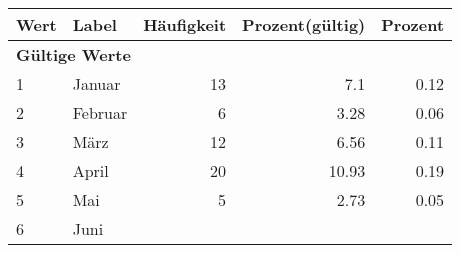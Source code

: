      \begin{longtable}{lXrrr}
     \toprule
     \textbf{Wert} & \textbf{Label} & \textbf{Häufigkeit} & \textbf{Prozent(gültig)} & \textbf{Prozent} \\
     \endhead
     \midrule
     \multicolumn{5}{l}{\textbf{Gültige Werte}}\\

     1 &
     \multicolumn{1}{X}{ Januar   } &


       \num{13} &
       \num[round-mode=places,round-precision=2]{7,1} &
         \num[round-mode=places,round-precision=2]{0,12} \\

     2 &
     \multicolumn{1}{X}{ Februar   } &


       \num{6} &
       \num[round-mode=places,round-precision=2]{3,28} &
         \num[round-mode=places,round-precision=2]{0,06} \\

     3 &
     \multicolumn{1}{X}{ März   } &


       \num{12} &
       \num[round-mode=places,round-precision=2]{6,56} &
         \num[round-mode=places,round-precision=2]{0,11} \\

     4 &
     \multicolumn{1}{X}{ April   } &


       \num{20} &
       \num[round-mode=places,round-precision=2]{10,93} &
         \num[round-mode=places,round-precision=2]{0,19} \\

     5 &
     \multicolumn{1}{X}{ Mai   } &


       \num{5} &
       \num[round-mode=places,round-precision=2]{2,73} &
         \num[round-mode=places,round-precision=2]{0,05} \\

     6 &
     \multicolumn{1}{X}{ Juni   } &



\end{longtable}
